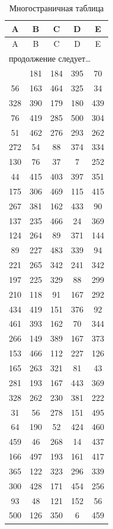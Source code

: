 \documentclass[a4paper,12pt]{article}
\begin{document}
\begin{longtable}{|c|c|c|c|c|}
\caption{Многостраничная таблица}\\
\hline
\textbf{A} & \textbf{B} & \textbf{C} & \textbf{D} & \textbf{E} \\
\hline
\endfirsthead
\hline
A & B & C & D & E \\
\hline
\endhead
\multicolumn{5}{l}{продолжение следует\ldots} \\
\endfoot
\hline
\endlastfoot
426 & 181 & 184 & 395 & 70 \\
56 & 163 & 464 & 325 & 34 \\
328 & 390 & 179 & 180 & 439 \\
76 & 419 & 285 & 500 & 304 \\
51 & 462 & 276 & 293 & 262 \\
272 & 54 & 88 & 374 & 334 \\
130 & 76 & 37 & 7 & 252 \\
44 & 415 & 403 & 397 & 351 \\
175 & 306 & 469 & 115 & 415 \\
267 & 381 & 162 & 433 & 90 \\
137 & 235 & 466 & 24 & 369 \\
124 & 264 & 89 & 371 & 144 \\
89 & 227 & 483 & 339 & 94 \\
221 & 265 & 342 & 241 & 342 \\
197 & 225 & 329 & 88 & 299 \\
210 & 118 & 91 & 167 & 292 \\
434 & 419 & 151 & 376 & 92 \\
461 & 393 & 162 & 70 & 344 \\
266 & 149 & 389 & 167 & 373 \\
153 & 466 & 112 & 227 & 126 \\
165 & 263 & 321 & 81 & 43 \\
281 & 193 & 167 & 443 & 369 \\
328 & 262 & 230 & 381 & 222 \\
31 & 56 & 278 & 151 & 495 \\
64 & 190 & 52 & 424 & 460 \\
459 & 46 & 268 & 14 & 437 \\
166 & 497 & 193 & 161 & 417 \\
365 & 122 & 323 & 296 & 339 \\
300 & 428 & 171 & 454 & 256 \\
93 & 48 & 121 & 152 & 56 \\
500 & 126 & 350 & 6 & 459 \\

\end{longtable}
\end{document}

